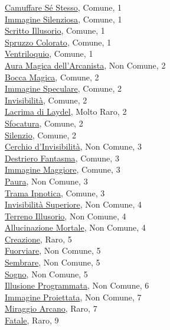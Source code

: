\begin{multicols}{3}
{{\hyperlink{Camuffare Sé Stesso}{Camuffare Sé Stesso}, Comune, 1\\
\hyperlink{Immagine Silenziosa}{Immagine Silenziosa}, Comune, 1\\
\hyperlink{Scritto Illusorio}{Scritto Illusorio}, Comune, 1\\
\hyperlink{Spruzzo Colorato}{Spruzzo Colorato}, Comune, 1\\
\hyperlink{Ventriloquio}{Ventriloquio}, Comune, 1\\
\hyperlink{Aura Magica dell'Arcanista}{Aura Magica dell'Arcanista}, Non Comune, 2\\
\hyperlink{Bocca Magica}{Bocca Magica}, Comune, 2\\
\hyperlink{Immagine Speculare}{Immagine Speculare}, Comune, 2\\
\hyperlink{Invisibilità}{Invisibilità}, Comune, 2\\
\hyperlink{Lacrima di Laydel}{Lacrima di Laydel}, Molto Raro, 2\\
\hyperlink{Sfocatura}{Sfocatura}, Comune, 2\\
\hyperlink{Silenzio}{Silenzio}, Comune, 2\\
\hyperlink{Cerchio d'Invisibilità}{Cerchio d'Invisibilità}, Non Comune, 3\\
\hyperlink{Destriero Fantasma}{Destriero Fantasma}, Comune, 3\\
\hyperlink{Immagine Maggiore}{Immagine Maggiore}, Comune, 3\\
\hyperlink{Paura}{Paura}, Non Comune, 3\\
\hyperlink{Trama Ipnotica}{Trama Ipnotica}, Comune, 3\\
\hyperlink{Invisibilità Superiore}{Invisibilità Superiore}, Non Comune, 4\\
\hyperlink{Terreno Illusorio}{Terreno Illusorio}, Non Comune, 4\\
\hyperlink{Allucinazione Mortale}{Allucinazione Mortale}, Non Comune, 4\\
\hyperlink{Creazione}{Creazione}, Raro, 5\\
\hyperlink{Fuorviare}{Fuorviare}, Non Comune, 5\\
\hyperlink{Sembrare}{Sembrare}, Non Comune, 5\\
\hyperlink{Sogno}{Sogno}, Non Comune, 5\\
\hyperlink{Illusione Programmata}{Illusione Programmata}, Non Comune, 6\\
\hyperlink{Immagine Proiettata}{Immagine Proiettata}, Non Comune, 7\\
\hyperlink{Miraggio Arcano}{Miraggio Arcano}, Raro, 7\\
\hyperlink{Fatale}{Fatale}, Raro, 9

}}
\end{multicols}
